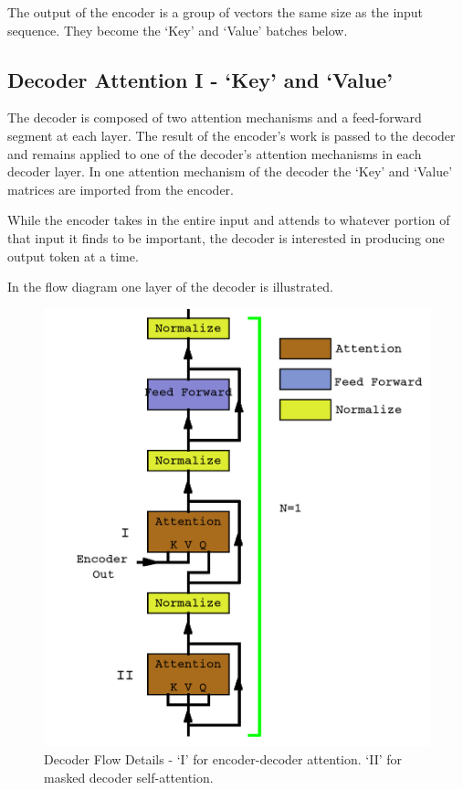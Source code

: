 The output of the encoder is a group of vectors the same size as the input sequence. They become the `Key' and `Value' batches below.

\subsection{Decoder Attention I - `Key' and `Value'}
The decoder is composed of two attention mechanisms and a feed-forward segment at each layer. The result of the encoder's work is passed to the decoder and remains applied to one of the decoder's attention mechanisms in each decoder layer. In one attention mechanism of the decoder the `Key' and `Value' matrices are imported from the encoder. 

While the encoder takes in the entire input and attends to whatever portion of that input it finds to be important, the decoder is interested in producing one output token at a time. 

In the flow diagram one layer of the decoder is illustrated.

\begin{figure}[H]
	\begin{center}
		
		
		\includegraphics[scale=1.25]{diagram-flow-decoder02}
	\end{center}
	\caption[Decoder Flow]{Decoder Flow Details - `I' for encoder-decoder attention. `II' for masked decoder self-attention.}
	
	
\end{figure}


